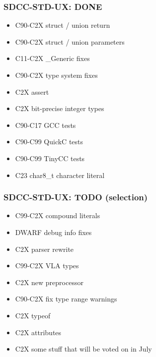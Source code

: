 \documentclass[xcolor=dvipsnames]{beamer}
\begin{document}
\begin{frame}
	\frametitle{SDCC-STD-UX: DONE}
	\begin{itemize}
		\item C90-C2X struct / union return
		\item C90-C2X struct / union parameters
		\item C11-C2X \_Generic fixes
		\item C90-C2X type system fixes
		\item C2X assert
		\item C2X bit-precise integer types
		\item C90-C17 GCC tests
		\item C90-C99 QuickC tests
		\item C90-C99 TinyCC tests
		\item C23 char8\_t character literal
	\end{itemize}
\end{frame}

\begin{frame}
	\frametitle{SDCC-STD-UX: TODO (selection)}
	\begin{itemize}
		\item C99-C2X compound literals
		\item DWARF debug info fixes
		\item C2X parser rewrite
		\item C99-C2X VLA types
		\item C2X new preprocessor
		\item C90-C2X fix type range warnings
		\item C2X typeof
		\item C2X attributes
		\item C2X some stuff that will be voted on in July
	\end{itemize}
\end{frame}
\end{document}
